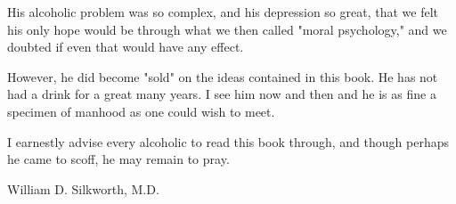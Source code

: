 {\begin{biblechapter}
\verse His alcoholic problem was so complex, 
    and his depression so great, 
    that we felt his only hope would be through what we then called "moral psychology," 
    and we doubted if even that would have any effect.

\verse However, he did become "sold" on the ideas contained in this book. 
\verse He has not had a drink for a great many years. 
\verse I see him now and then and he is as fine a specimen of manhood as one could wish to meet.

\verse I earnestly advise every alcoholic to read this book through, 
    and though perhaps he came to scoff, 
    he may remain to pray.

\verse William D. Silkworth, M.D.
\end{biblechapter}
}
